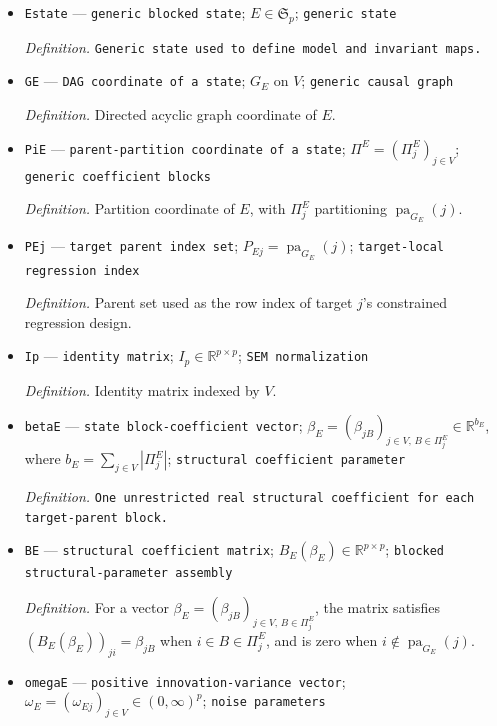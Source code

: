 \documentclass{article}
\begin{document}
\begin{itemize}
  \item \texttt{Estate} --- \texttt{generic blocked state}; \(E\in\mathfrak S_p\); \texttt{generic state}
  \par\smallskip\noindent\emph{Definition.} \texttt{Generic state used to define model and invariant maps.}
  \item \texttt{GE} --- \texttt{DAG coordinate of a state}; \(G_E\) on \(V\); \texttt{generic causal graph}
  \par\smallskip\noindent\emph{Definition.} Directed acyclic graph coordinate of \(E\).
  \item \texttt{PiE} --- \texttt{parent-\allowbreak{}partition coordinate of a state}; \(\Pi^E=(\Pi^E_j)_{j\in V}\); \texttt{generic coefficient blocks}
  \par\smallskip\noindent\emph{Definition.} Partition coordinate of \(E\), with \(\Pi^E_j\) partitioning \(\operatorname{pa}_{G_E}(j)\).
  \item \texttt{PEj} --- \texttt{target parent index set}; \(P_{Ej}=\operatorname{pa}_{G_E}(j)\); \texttt{target-\allowbreak{}local regression index}
  \par\smallskip\noindent\emph{Definition.} Parent set used as the row index of target \(j\)'s constrained regression design.
  \item \texttt{Ip} --- \texttt{identity matrix}; \(I_p\in\mathbb R^{p\times p}\); \texttt{SEM normalization}
  \par\smallskip\noindent\emph{Definition.} Identity matrix indexed by \(V\).
  \item \texttt{betaE} --- \texttt{state block-\allowbreak{}coefficient vector}; \(\beta_E=(\beta_{jB})_{j\in V,\,B\in\Pi^E_j}\in\mathbb R^{b_E}\), where \(b_E=\sum_{j\in V}|\Pi^E_j|\); \texttt{structural coefficient parameter}
  \par\smallskip\noindent\emph{Definition.} \texttt{One unrestricted real structural coefficient for each target-\allowbreak{}parent block.}
  \item \texttt{BE} --- \texttt{structural coefficient matrix}; \(B_E(\beta_E)\in\mathbb R^{p\times p}\); \texttt{blocked structural-\allowbreak{}parameter assembly}
  \par\smallskip\noindent\emph{Definition.} For a vector \(\beta_E=(\beta_{jB})_{j\in V,\,B\in\Pi^E_j}\), the matrix satisfies \( (B_E(\beta_E))_{ji}=\beta_{jB}\) when \(i\in B\in\Pi^E_j\), and is zero when \(i\notin\operatorname{pa}_{G_E}(j)\).
  \item \texttt{omegaE} --- \texttt{positive innovation-\allowbreak{}variance vector}; \(\omega_E=(\omega_{Ej})_{j\in V}\in(0,\infty)^p\); \texttt{noise parameters}

\end{itemize}
\end{document}
